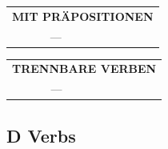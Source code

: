 \documentclass[10pt,a4paper]{revtex4-2}
\begin{document}
\begin{verbbox}
\vspace{10pt}

\begin{tabular}{lll}
\multicolumn{3}{l}{\textbf{MIT PRÄPOSITIONEN}}\\
& ---\\
\end{tabular}
\hfill
\begin{tabular}{lll}
\multicolumn{3}{l}{\textbf{TRENNBARE VERBEN}}\\
& ---\\
\end{tabular}
\vspace{-5pt}
\end{verbbox}

\subsection{D Verbs}
\end{document}
